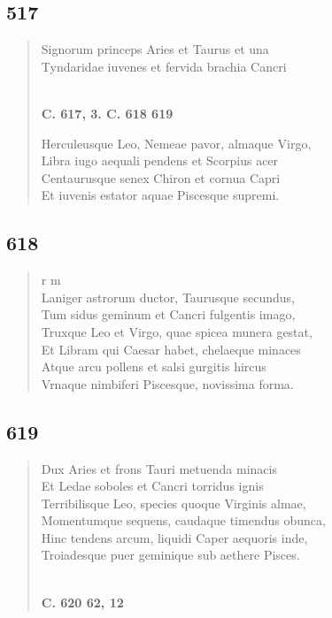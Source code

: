 \documentclass[11pt, a4paper]{report}
\begin{document}
            \subsection*{517}
      \begin{verse}
      Signorum princeps Aries et Taurus et una \\ Tyndaridae iuvenes et fervida brachia Cancri \\ 
        ﻿\pagebreak 
    \begin{center} \textbf{C. 617, 3. C. 618 619} \end{center} \marginpar{[92]} Herculeusque Leo, Nemeae pavor, almaque Virgo, \\ Libra iugo aequali pendens et Scorpius acer \\ Centaurusque senex Chiron et cornua Capri \\ Et iuvenis estator aquae Piscesque supremi. \\ 
      \end{verse}
  
            \subsection*{618}
      \begin{verse}
      r m \\ Laniger astrorum ductor, Taurusque secundus, \\ Tum sidus geminum et Cancri fulgentis imago, \\ Truxque Leo et Virgo, quae spicea munera gestat, \\ Et Libram qui Caesar habet, chelaeque minaces \\ Atque arcu pollens et salsi gurgitis hircus \\ Vrnaque nimbiferi Piscesque, novissima forma. \\ 
      \end{verse}
  
            \subsection*{619}
      \begin{verse}
      Dux Aries et frons Tauri metuenda minacis \\ Et Ledae soboles et Cancri torridus ignis \\ Terribilisque Leo, species quoque Virginis almae, \\ Momentumque sequens, caudaque timendus obunca, \\ Hinc tendens arcum, liquidi Caper aequoris inde, \\ Troiadesque puer geminique sub aethere Pisces. \\ 
        ﻿\pagebreak 
    \begin{center} \textbf{C. 620 62, 12} \end{center} \marginpar{[93]} 
      \end{verse}
  
\end{document}
